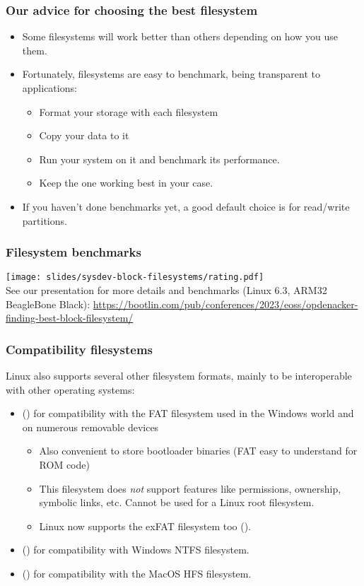 \begin{frame}
  \frametitle{Our advice for choosing the best filesystem}
  \begin{itemize}
     \item Some filesystems will work better than others
           depending on how you use them.
     \item Fortunately, filesystems are easy to benchmark, being
           transparent to applications:
           \begin{itemize}
             \item Format your storage with each filesystem
	     \item Copy your data to it
	     \item Run your system on it and benchmark its
                   performance.
	     \item Keep the one working best in your case.
           \end{itemize}
     \item If you haven't done benchmarks yet, a good default choice
           is  for read/write partitions.
  \end{itemize}
\end{frame}

\begin{frame}
  \frametitle{Filesystem benchmarks}
  \texttt{[image: slides/sysdev-block-filesystems/rating.pdf]}\\
  \small
  See our presentation for more details and benchmarks (Linux 6.3, ARM32 BeagleBone Black):
  \scriptsize
  \url{https://bootlin.com/pub/conferences/2023/eoss/opdenacker-finding-best-block-filesystem/}
\end{frame}

\begin{frame}
  \frametitle{Compatibility filesystems}
  Linux also supports several other filesystem formats, mainly to be
  interoperable with other operating systems:
  \begin{itemize}
  \item {} () for compatibility with the FAT filesystem used in
    the Windows world and on numerous removable devices
    \begin{itemize}
    \item Also convenient to store bootloader binaries (FAT easy
      to understand for ROM code)
    \item This filesystem does {\em not} support features like
      permissions, ownership, symbolic links, etc. Cannot be used for
      a Linux root filesystem.
    \item Linux now supports the exFAT filesystem too ().
    \end{itemize}
  \item {} () for compatibility with
      Windows NTFS filesystem.
  \item {} () for compatibility with the
      MacOS HFS filesystem.
  \end{itemize}
\end{frame}


